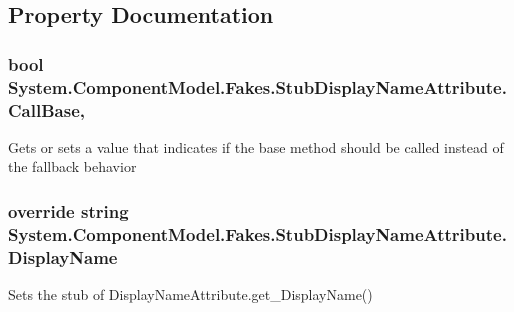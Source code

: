\subsection{Property Documentation}
\hypertarget{class_system_1_1_component_model_1_1_fakes_1_1_stub_display_name_attribute_ab4cf6d7f1184b060852fd5c95c958496}{
\subsubsection[{Call\-Base}]{\setlength{\rightskip}{0pt plus 5cm}bool System.\-Component\-Model.\-Fakes.\-Stub\-Display\-Name\-Attribute.\-Call\-Base\hspace{0.3cm}{\ttfamily [get]}, {\ttfamily [set]}}}\label{class_system_1_1_component_model_1_1_fakes_1_1_stub_display_name_attribute_ab4cf6d7f1184b060852fd5c95c958496}


Gets or sets a value that indicates if the base method should be called instead of the fallback behavior

\hypertarget{class_system_1_1_component_model_1_1_fakes_1_1_stub_display_name_attribute_a2c0903d0e2f2f632156c9aca8ff59cc9}{
\subsubsection[{Display\-Name}]{\setlength{\rightskip}{0pt plus 5cm}override string System.\-Component\-Model.\-Fakes.\-Stub\-Display\-Name\-Attribute.\-Display\-Name\hspace{0.3cm}{\ttfamily [get]}}}\label{class_system_1_1_component_model_1_1_fakes_1_1_stub_display_name_attribute_a2c0903d0e2f2f632156c9aca8ff59cc9}


Sets the stub of Display\-Name\-Attribute.\-get\-\_\-\-Display\-Name()

